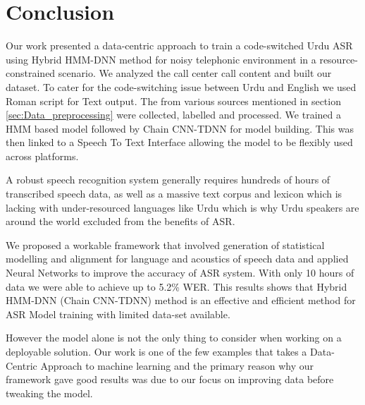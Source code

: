 \documentclass[a4paper, 11pt]{article}
\begin{document}
\section{Conclusion} %
\label{cha:discussion_conclusion}
Our work presented a data-centric approach to train a code-switched Urdu ASR using Hybrid HMM-DNN method for noisy telephonic environment in a resource-constrained scenario. We analyzed the call center call content and built our dataset. To cater for the code-switching issue between Urdu and English we used Roman script for Text output. The from various sources mentioned in section \ref{sec:Data_preprocessing} were collected, labelled and processed. We trained a HMM based model followed by Chain CNN-TDNN for model building. This was then linked to a Speech To Text Interface allowing the model to be flexibly used across platforms.


A robust speech recognition system generally requires hundreds of hours of transcribed speech data, as well as a massive text corpus and lexicon which is lacking with under-resourced languages like Urdu which is why Urdu speakers are around the world excluded from the benefits of ASR.

We proposed a workable framework that involved generation of statistical modelling and alignment for language and acoustics of speech data and applied Neural Networks to improve the accuracy of ASR system. With only 10 hours of data we were able to achieve up to 5.2\% WER. This results shows that Hybrid HMM-DNN (Chain CNN-TDNN) method is an effective and efficient method for ASR Model training with limited data-set available. 

However the model alone is not the only thing to consider when working on a deployable solution. Our work is one of the few examples that takes a Data-Centric Approach to machine learning and the primary reason why our framework gave good results was due to our focus on improving data before tweaking the model.
\end{document}
